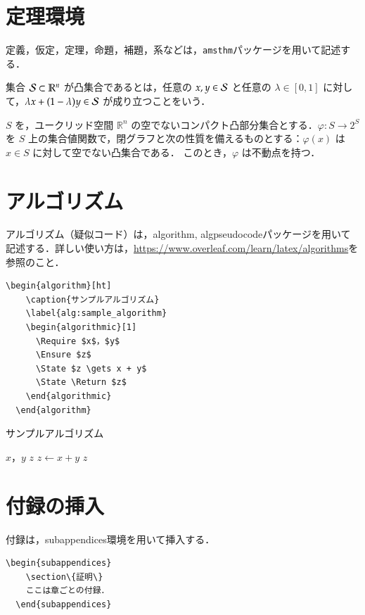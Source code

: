 \documentclass[../main/main]{subfiles}
\begin{document}
\section{定理環境}
定義，仮定，定理，命題，補題，系などは，\verb|amsthm|パッケージを用いて記述する．
\begin{dfn}[凸集合]
  集合 $\mathcal{S} \subset \mathbb{R}^n$ が凸集合であるとは，任意の $x, y \in \mathcal{S}$ と任意の $\lambda \in [0, 1]$ に対して，$\lambda x + (1 - \lambda) y \in \mathcal{S}$ が成り立つことをいう．
\end{dfn}
\begin{thm}[角谷の不動点定理]
  \label{thm:Kakutani}
  $S$ を，ユークリッド空間 $\mathbb{R}^n$ の空でないコンパクト凸部分集合とする．$\varphi: S \rightarrow 2^S$ を $S$ 上の集合値関数で，閉グラフと次の性質を備えるものとする：$\varphi(x)$ は $x \in S$ に対して空でない凸集合である．
  このとき，$\varphi$ は不動点を持つ．
\end{thm}



\newpage
\section{アルゴリズム}
アルゴリズム（疑似コード）は，algorithm, algpseudocodeパッケージを用いて記述する．詳しい使い方は，\url{https://www.overleaf.com/learn/latex/algorithms}を参照のこと．
\begin{lstlisting}[language={[latex]TeX}]
  \begin{algorithm}[ht]
    \caption{サンプルアルゴリズム}
    \label{alg:sample_algorithm}
    \begin{algorithmic}[1]
      \Require $x$，$y$
      \Ensure $z$
      \State $z \gets x + y$
      \State \Return $z$
    \end{algorithmic}
  \end{algorithm}
\end{lstlisting}
\begin{algorithm}[!ht]
  \caption{サンプルアルゴリズム}
  \label{alg:sample_algorithm}
  \begin{algorithmic}[1]
    \Require $x$，$y$
    \Ensure $z$
    \State $z \gets x + y$
    \State \Return $z$
  \end{algorithmic}
\end{algorithm}

\section{付録の挿入}
付録は，subappendices環境を用いて挿入する．
\begin{lstlisting}[language={[latex]TeX}]
  \begin{subappendices}
    \section\{証明\}
    ここは章ごとの付録．
  \end{subappendices}
\end{lstlisting}
\end{document}
